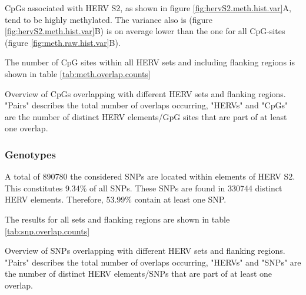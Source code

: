 \documentclass[a4paper,12pt,twoside,openright]{article}
\begin{document}
CpGs associated with HERV S2, as shown in figure \ref{fig:hervS2.meth.hist.var}A, tend to be highly methylated. The variance also is (figure \ref{fig:hervS2.meth.hist.var}B) is on average lower than the one for all CpG-sites (figure \ref{fig:meth.raw.hist.var}B).

The number of CpG sites within all HERV sets and including flanking regions is shown in table \ref{tab:meth.overlap.counts}

\begin{table}[h!]
  \begin{center}
  \end{center}        
	\caption{Overview of CpGs overlapping with different HERV sets and flanking regions. "Pairs" describes the total number of overlaps occurring, "HERVs" and "CpGs" are the number of distinct HERV elements/GpG sites that are part of at least one overlap.}
	\label{tab:meth.overlap.counts}
\end{table} 
\subsubsection{Genotypes}
A total of 890780 the considered SNPs are located within elements of HERV S2. This constitutes 9.34\% of all SNPs. These SNPs are found in 330744 distinct HERV elements. Therefore, 53.99\% contain at least one SNP.

The results for all sets and flanking regions are shown in table \ref{tab:snp.overlap.counts}

\begin{table}[h!]
  \begin{center}
  \end{center}        
	\caption{Overview of SNPs overlapping with different HERV sets and flanking regions. "Pairs" describes the total number of overlaps occurring, "HERVs" and "SNPs" are the number of distinct HERV elements/SNPs that are part of at least one overlap.}
	\label{tab:snp.overlap.counts}
\end{table} 
\end{document}
